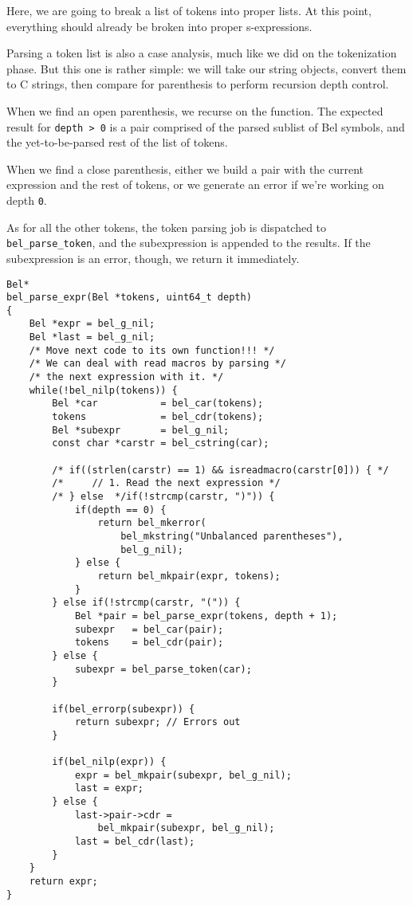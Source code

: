 \documentclass[openright,a4paper,twoside,12pt]{memoir}
\begin{document}
Here, we  are going to  break a list of  tokens into proper  lists. At
this  point,   everything  should   already  be  broken   into  proper
s-expressions.

Parsing a token list is also a  case analysis, much like we did on the
tokenization phase.  But this one is  rather simple: we will  take our
string  objects,  convert   them  to  C  strings,   then  compare  for
parenthesis to perform recursion depth control.

When we  find an  open parenthesis,  we recurse  on the  function. The
expected  result for  \texttt{depth >  0}  is a  pair comprised  of the  parsed
sublist of Bel  symbols, and the yet-to-be-parsed rest of  the list of
tokens.

When we  find a  close parenthesis,  either we build  a pair  with the
current expression and the rest of  tokens, or we generate an error if
we're working on depth \texttt{0}.

As for  all the other tokens,  the token parsing job  is dispatched to
\texttt{bel\_parse\_token}, and the subexpression is  appended to the results. If
the subexpression is an error, though, we return it immediately.

\begin{verbatim}
Bel*
bel_parse_expr(Bel *tokens, uint64_t depth)
{
    Bel *expr = bel_g_nil;
    Bel *last = bel_g_nil;
    /* Move next code to its own function!!! */
    /* We can deal with read macros by parsing */
    /* the next expression with it. */
    while(!bel_nilp(tokens)) {
        Bel *car           = bel_car(tokens);
        tokens             = bel_cdr(tokens);
        Bel *subexpr       = bel_g_nil;
        const char *carstr = bel_cstring(car);

        /* if((strlen(carstr) == 1) && isreadmacro(carstr[0])) { */
        /*     // 1. Read the next expression */
        /* } else  */if(!strcmp(carstr, ")")) {
            if(depth == 0) {
                return bel_mkerror(
                    bel_mkstring("Unbalanced parentheses"),
                    bel_g_nil);
            } else {
                return bel_mkpair(expr, tokens);
            }
        } else if(!strcmp(carstr, "(")) {
            Bel *pair = bel_parse_expr(tokens, depth + 1);
            subexpr   = bel_car(pair);
            tokens    = bel_cdr(pair);
        } else {
            subexpr = bel_parse_token(car);
        }

        if(bel_errorp(subexpr)) {
            return subexpr; // Errors out
        }

        if(bel_nilp(expr)) {
            expr = bel_mkpair(subexpr, bel_g_nil);
            last = expr;
        } else {
            last->pair->cdr =
                bel_mkpair(subexpr, bel_g_nil);
            last = bel_cdr(last);
        }
    }
    return expr;
}
\end{verbatim}
\end{document}
